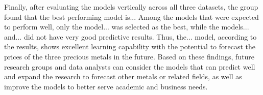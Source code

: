 \documentclass{ieeeojies}
\begin{document}
\begin{table}[h!]
    \centering
    \caption{\centering Vertically evaluating models ranking table}
    \label{table:models}
\end{table}

\indent Finally, after evaluating the models vertically across all three datasets, the group found that the best performing model is... Among the models that were expected to perform well, only the model... was selected as the best, while the models... and... did not have very good predictive results. Thus, the... model, according to the results, shows excellent learning capability with the potential to forecast the prices of the three precious metals in the future. Based on these findings, future research groups and data analysts can consider the models that can predict well and expand the research to forecast other metals or related fields, as well as improve the models to better serve academic and business needs.
\end{document}
